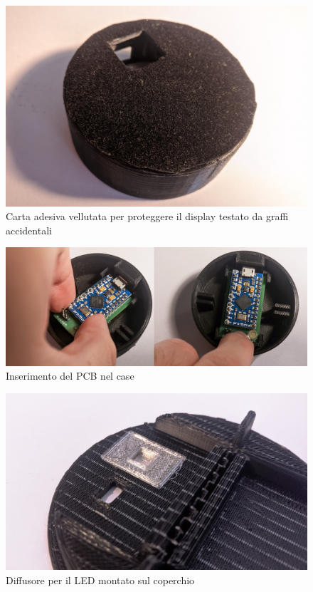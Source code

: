 \begin{figure}[H]
	\centering
	\includegraphics[width=\textwidth]{Dispositivo_files/assembly_13.jpg}
	\caption{Carta adesiva vellutata per proteggere il display testato da graffi accidentali}
	\label{fig:assembly_13}
\end{figure}

\begin{figure}[H]
	\centering
	\includegraphics[width=\textwidth]{Dispositivo_files/assembly_14.jpg}
	\caption{Inserimento del PCB nel case}
	\label{fig:assembly_14}
\end{figure}

\begin{figure}[H]
	\centering
	\includegraphics[width=\textwidth]{Dispositivo_files/assembly_16.jpg}
	\caption{Diffusore per il LED montato sul coperchio}
	\label{fig:assembly_16}
\end{figure}

